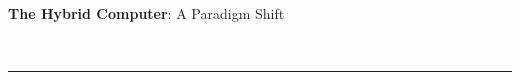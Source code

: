 \documentclass[12pt]{article}
\begin{document}
    \clearpage
    
     \centerline{\Large\textbf{{The Hybrid Computer}}:
                               {A Paradigm Shift}}\
     \vspace{-7.5mm}\hrule\vspace{-2.5mm}
    
\end{document}
